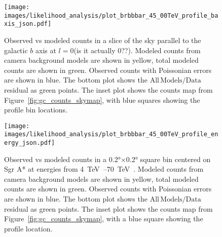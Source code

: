   \begin{figure}[t]
    \centering
    \texttt{[image: images/likelihood\_analysis/plot\_brbbbar\_45\_00TeV\_profile\_baxis\_json.pdf]}
    \caption[Galactic Center Profile vs Galactic $b$]{
      Observed vs modeled counts in a slice of the sky parallel to the galactic $b$ axis at $l=0${\color{red}(is it actually 0??)}.
      Modeled counts from camera background models are shown in yellow, total modeled counts are shown in green.
      Observed counts with Poissonian errors are shown in blue.
      The bottom plot shows the $\mathrm{All\,Models}/\mathrm{Data}$ residual as green points.
      The inset plot shows the counts map from Figure~\ref{fig:gc_counts_skymap}, with blue squares showing the profile bin locations.
    }
    \label{fig:gc_profile_gal_b}
  \end{figure}

  
  \begin{figure}[t]
    \centering
    \texttt{[image: images/likelihood\_analysis/plot\_brbbbar\_45\_00TeV\_profile\_energy\_json.pdf]}
    \caption[Galactic Center Profile vs Energy]{
      Observed vs modeled counts in a \ang{0.2}$\times$\ang{0.2} square bin centered on Sgr A* at energies from \SIrange{4}{70}{\TeV{}}.
      Modeled counts from camera background models are shown in yellow, total modeled counts are shown in green.
      Observed counts with Poissonian errors are shown in blue.
      The bottom plot shows the $\mathrm{All\,Models}/\mathrm{Data}$ residual as green points.
      The inset plot shows the counts map from Figure~\ref{fig:gc_counts_skymap}, with a blue square showing the profile location.
      }
    \label{fig:gc_profile_energy}
  \end{figure}
  
